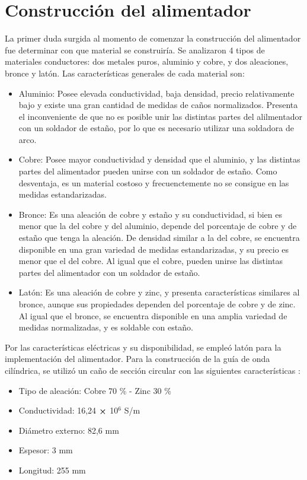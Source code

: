 \section{Construcción del alimentador}
\label{sec_resultados_cons_alim}

La primer duda surgida al momento de comenzar la construcción del alimentador fue determinar con que material se construiría. Se analizaron 4 tipos de materiales conductores: dos metales puros, aluminio y cobre, y dos aleaciones, bronce y latón. Las características generales de cada material son:
\begin{itemize}
\item Aluminio: Posee elevada conductividad, baja densidad, precio relativamente bajo y existe una gran cantidad de medidas de caños normalizados. Presenta el inconveniente de que no es posible unir las distintas partes del alilmentador con un soldador de estaño, por lo que es necesario utilizar una soldadora de arco.
\item Cobre: Posee mayor conductividad y densidad que el aluminio, y las distintas partes del alimentador pueden unirse con un soldador de estaño. Como desventaja, es un material costoso y frecuenctemente no se consigue en las medidas estandarizadas.
\item Bronce: Es una aleación de cobre y estaño y su conductividad, si bien es menor que la del cobre y del aluminio, depende del porcentaje de cobre y de estaño que tenga la aleación. De densidad similar a la del cobre, se encuentra disponible en una gran variedad de medidas estandarizadas, y su precio es menor que el del cobre. Al igual que el cobre, pueden unirse las distintas partes del alimentador con un soldador de estaño.
\item Latón: Es una aleación de cobre y zinc, y presenta características similares al bronce, aunque sus propiedades dependen del porcentaje de cobre y de zinc. Al igual que el bronce, se encuentra disponible en una amplia variedad de medidas normalizadas, y es soldable con estaño.
\end{itemize}
Por las características eléctricas y su disponibilidad, se empleó latón para la implementación del alimentador. Para la construcción de la guía de onda cilíndrica, se utilizó un caño de sección circular con las siguientes características \cite{laton}:
\begin{itemize}
\item Tipo de aleación: Cobre 70 \% - Zinc 30 \%
\item Conductividad: 16,24 $\boldsymbol{\times}$ 10$^{6}$ S/m
\item Diámetro externo: 82,6 mm
\item Espesor: 3 mm
\item Longitud: 255 mm
\end{itemize}
